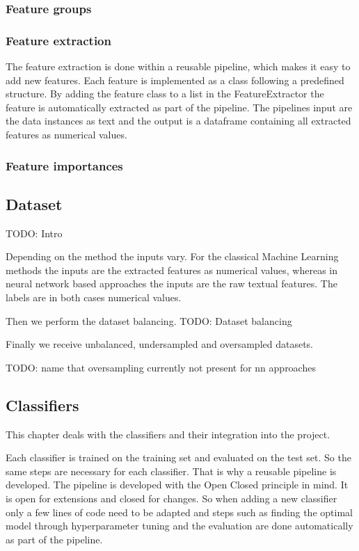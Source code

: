 \subsubsection*{Feature groups}

\subsubsection*{Feature extraction}
The feature extraction is done within a reusable pipeline, which makes it easy to add new features. Each feature is implemented as a class following a predefined structure. By adding the feature class to a list in the Feature\-Extractor the feature is automatically extracted as part of the pipeline. The pipelines input are the data instances as text and the output is a dataframe containing all extracted features as numerical values.

\subsubsection*{Feature importances}


\subsection{Dataset}
\label{ch:approachD}

TODO: Intro

Depending on the method the inputs vary. For the classical Machine Learning methods the inputs are the extracted features as numerical values, whereas in neural network based approaches the inputs are the raw textual features. The labels are in both cases numerical values.

Then we perform the dataset balancing.
TODO: Dataset balancing


Finally we receive unbalanced, undersampled and oversampled datasets.

TODO: name that oversampling currently not present for nn approaches


\subsection{Classifiers}
\label{ch:approachE}

This chapter deals with the classifiers and their integration into the project.

Each classifier is trained on the training set and evaluated on the test set. So the same steps are necessary for each classifier. That is why a reusable pipeline is developed. The pipeline is developed with the Open Closed principle in mind. It is open for extensions and closed for changes. So when adding a new classifier only a few lines of code need to be adapted and steps such as finding the optimal model through hyperparameter tuning and the evaluation are done automatically as part of the pipeline.


